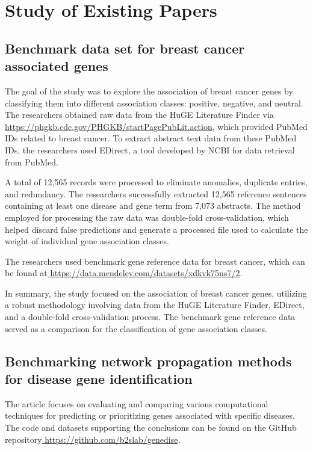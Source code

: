 

\section{Study of Existing Papers}
\subsection{Benchmark data set for breast cancer associated genes\cite{35}} 
The goal of the study was to explore the association of breast cancer genes by classifying them into different association classes: positive, negative, and neutral. The researchers obtained raw data from the HuGE Literature Finder via\href{https://phgkb.cdc.gov/PHGKB/startPagePubLit.action}{ https://phgkb.cdc.gov/PHGKB/startPagePubLit.action}, which provided PubMed IDs related to breast cancer. To extract abstract text data from these PubMed IDs, the researchers used EDirect, a tool developed by NCBI for data retrieval from PubMed.

A total of 12,565 records were processed to eliminate anomalies, duplicate entries, and redundancy. The researchers successfully extracted 12,565 reference sentences containing at least one disease and gene term from 7,073 abstracts. The method employed for processing the raw data was double-fold cross-validation, which helped discard false predictions and generate a processed file used to calculate the weight of individual gene association classes.

The researchers used benchmark gene reference data for breast cancer, which can be found at\href{https://data.mendeley.com/datasets/xdkvk75ns7/2}{ https://data.mendeley.com/datasets/xdkvk75ns7/2}.

In summary, the study focused on the association of breast cancer genes, utilizing a robust methodology involving data from the HuGE Literature Finder, EDirect, and a double-fold cross-validation process. The benchmark gene reference data served as a comparison for the classification of gene association classes.

 
\subsection{Benchmarking network propagation methods for disease gene identification\cite{36}}
The article focuses on evaluating and comparing various computational techniques for predicting or prioritizing genes associated with specific diseases. The code and datasets supporting the conclusions can be found on the GitHub repository\href{https://github.com/b2slab/genedise}{ https://github.com/b2slab/genedise}.

